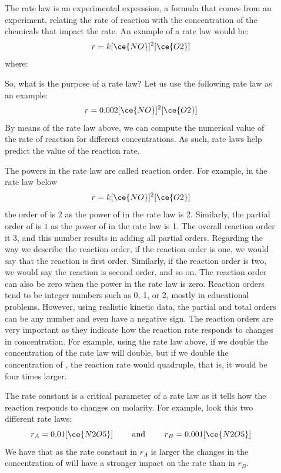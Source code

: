 \documentclass[main.tex]{subfiles}
\begin{document}
\begin{description}
\item[] 
The rate law is an experimental expression, a formula that comes from an experiment, relating the rate of reaction with the concentration of the chemicals that impact the rate. An example of a rate law would be:
\[r=k[\ce{NO}]^2[\ce{O2}]\]
where:
So, what is the purpose of a rate law? Let us use the following rate law as an example:
\[r=0.002[\ce{NO}]^2[\ce{O2}]\]
By means of the rate law above, we can compute the numerical value of the rate of reaction for different concentrations. As such, rate laws help predict the value of the reaction rate. 



\item[] 
The powers in the rate law are called reaction order. For example, in the rate law below
\[r=k[\ce{NO}]^2[\ce{O2}]\]
the order of  is $2$ as the power of  in the rate law is 2. Similarly, the partial order of  is $1$ as the power of  in the rate law is 1. The overall reaction order it 3, and this number results in adding all partial orders. Regarding the way we describe the reaction order, if the reaction order is one, we would say that the reaction is first order. Similarly, if the reaction order is two, we would say the reaction is second order, and so on. The reaction order can also be zero when the power in the rate law is zero. Reaction orders tend to be integer numbers such as 0, 1, or 2, mostly in educational problems. However, using realistic kinetic data, the partial and total orders can be any number and even have a negative sign. The reaction orders are very important as they indicate how the reaction rate responds to changes in concentration. For example, using the rate law above, if we double the concentration of  the rate law will double, but if we double the concentration of , the reaction rate would quadruple, that is, it would be four times larger.
\item[] 
The rate constant is a critical parameter of a rate law as it tells how the reaction responds to changes on molarity. For example, look this two different rate laws:
\[r_A=0.01[\ce{N2O5}]\quad\quad \text{ and } \quad\quad r_B=0.001[\ce{N2O5 }]\]
We have that as the rate constant in $r_A$ is larger the changes in the concentration of  will have a stronger impact on the rate than in  $r_B$. 


\end{description}
\end{document}
